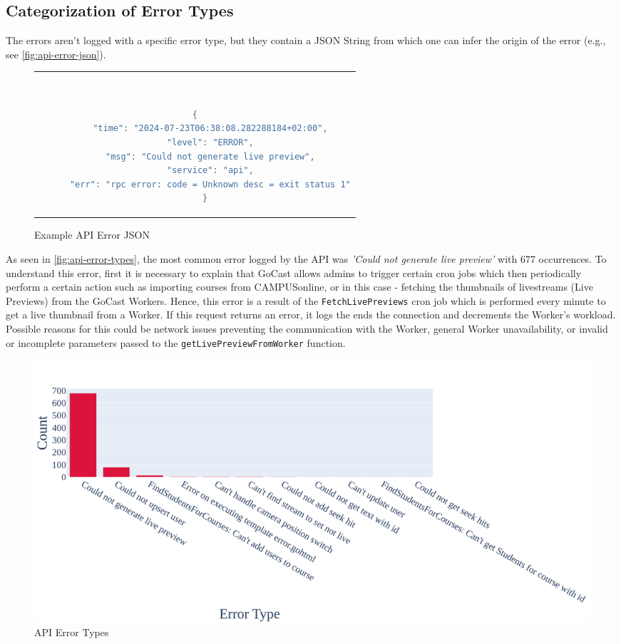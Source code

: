 \subsection{Categorization of Error Types}

The errors aren't logged with a specific error type, but they contain a JSON String from which one can infer the origin of the error (e.g., see \autoref{fig:api-error-json}).

\begin{figure}[htpb]
  \begin{tabular}{c}
  \ \small \begin{lstlisting}[language=Java]
    {
      "time": "2024-07-23T06:38:08.282288184+02:00",
      "level": "ERROR",
      "msg": "Could not generate live preview",
      "service": "api",
      "err": "rpc error: code = Unknown desc = exit status 1"
    }
    \end{lstlisting}
  \end{tabular}
  \caption[Example \ac{API} Error JSON]{Example \ac{API} Error JSON}\label{fig:api-error-json}
\end{figure}

As seen in \autoref{fig:api-error-types}, the most common error logged by the \ac{API} was \textit{'Could not generate live preview'} with 677 occurrences. To understand this error, first it is necessary to explain that GoCast allows admins to trigger certain cron jobs which then periodically perform a certain action such as importing courses from CAMPUSonline, or in this case - fetching the thumbnails of livestreams (Live Previews) from the GoCast Workers. Hence, this error is a result of the \texttt{FetchLivePreviews} cron job which is performed every minute to get a live thumbnail from a Worker. If this request returns an error, it logs the  ends the connection and decrements the Worker's workload. Possible reasons for this could be network issues preventing the communication with the Worker, general Worker unavailability, or invalid or incomplete parameters passed to the \texttt{getLivePreviewFromWorker} function.

\begin{figure}[htpb]
    \centering
    \includegraphics[width=\linewidth]{images/plots/api/error_types.png}
    \caption[\ac{API} Error Types]{\ac{API} Error Types}\label{fig:api-error-types}
\end{figure}

